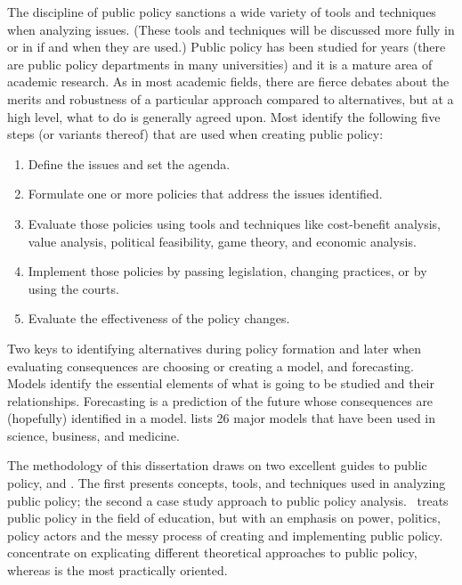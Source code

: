 The discipline of public policy sanctions a wide variety of tools and techniques when analyzing issues. (These tools and techniques will be discussed more fully in  or in  if and when they are used.) Public policy has been studied for years (there are public policy departments in many universities) and it is a mature area of academic research. As in most academic fields, there are fierce debates about the merits and robustness of a particular approach compared to alternatives, but at a high level, what to do is generally agreed upon. Most identify the following five steps (or variants thereof) that are used when creating public policy:
\begin{enumerate}
    \item Define the issues and set the agenda.
    \item Formulate one or more policies that address the issues identified.
    \item Evaluate those policies using tools and techniques like cost-benefit analysis, value analysis, political feasibility, game theory, and economic analysis.
    \item Implement those policies by passing legislation, changing practices, or by using the courts.
    \item Evaluate the effectiveness of the policy changes.
  \end{enumerate}
  
Two keys to identifying alternatives during policy formation and later when evaluating consequences are choosing or creating a model, and forecasting. Models identify the essential elements of what is going to be studied and their relationships. Forecasting is a prediction of the future whose consequences are (hopefully) identified in a model. \textcite{Page2018} lists 26 major models that have been used in science, business, and medicine. %

The methodology of this dissertation draws on two excellent guides to public policy, \textcite{Clemons.McBeth2021} and \textcite{Gupta2011}. The first presents concepts, tools, and techniques used in analyzing public policy; the second a case study approach to public policy analysis. \textcite{Fowler2013} treats public policy in the field of education, but with an emphasis on power, politics, policy actors and the messy process of creating and implementing public policy.  \citeauthor{Clemons.McBeth2021} concentrate on explicating different theoretical approaches to public policy, whereas \citeauthor{Gupta2011} is the most practically oriented.

